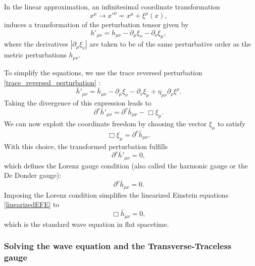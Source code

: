 In the linear approximation, an infinitesimal coordinate transformation
\begin{equation}
    x^{\mu} \rightarrow x'^{\mu} = x^{\mu} + \xi^{\mu}(x),
\label{transformation}
\end{equation}
induces a transformation of the perturbation tensor given by
\begin{equation}
    h'_{\mu\nu} = h_{\mu\nu} - \partial_{\mu}\xi_{\nu} - \partial_{\nu}\xi_{\mu},
\end{equation}
where the derivatives $|\partial_{\mu}\xi_{\nu}|$ are taken to be of the same
perturbative order as the metric perturbations $h_{\mu\nu}$.

To simplify the equations, we use the trace reversed perturbation \eqref{trace_reversed_perturbation} \cite{maggiore2007gravitational}:
\begin{equation}
    \bar{h}'_{\mu\nu} = \bar{h}_{\mu\nu}
    - \partial_{\mu}\xi_{\nu}
    - \partial_{\nu}\xi_{\mu}
    + \eta_{\mu\nu}\partial_{\rho}\xi^{\rho}.
\end{equation}
Taking the divergence of this expression leads to
\begin{equation}
    \partial^{\nu}\bar{h}'_{\mu\nu}
    = \partial^{\nu}\bar{h}_{\mu\nu}
    - \Box \xi_{\mu}.
\label{gaugefreedom}
\end{equation}  
We can now exploit the coordinate freedom by choosing the vector $\xi_{\mu}$ to satisfy
\begin{equation}
    \Box \xi_{\mu} = \partial^{\nu}\bar{h}_{\mu\nu}.
\end{equation}
With this choice, the transformed perturbation fulfills
\begin{equation}
    \partial^{\nu}\bar{h}'_{\mu\nu} = 0,
\label{lorenzgauge}
\end{equation}
which defines the Lorenz gauge condition \cite{maggiore2007gravitational} (also called the harmonic gauge or the De Donder gauge):
\begin{equation}
    \partial^{\nu}\bar{h}_{\mu\nu} = 0.
\label{Lorenz_gauge_condition}
\end{equation}
Imposing the Lorenz condition simplifies the linearized Einstein equations \eqref{linearizedEFE} to
\begin{equation}
    \Box \bar{h}_{\mu\nu} = 0,
\label{linearized_wave_equation}
\end{equation}
which is the standard wave equation in flat spacetime. 

\subsubsection{Solving the wave equation and the Transverse-Traceless gauge}

